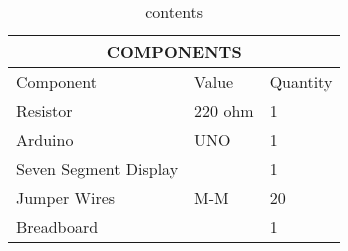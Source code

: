 \begin{table}[h]
	\begin{center}
\begin{tabular}{|p{5cm}|p{3cm}|p{2cm}|}
	\hline
	\multicolumn{3}{|c|}{COMPONENTS}\\
	\hline
	Component& Value& Quantity\\
	\hline
	Resistor& 220 ohm& 1\\
	\hline
	Arduino& UNO& 1\\
	\hline
	Seven Segment Display& & 1\\
	\hline
	Jumper Wires& M-M& 20\\
	\hline
	Breadboard& & 1\\
	\hline
\end{tabular}
	\end{center}
\caption{contents}
\label{table 1}
\end{table}
